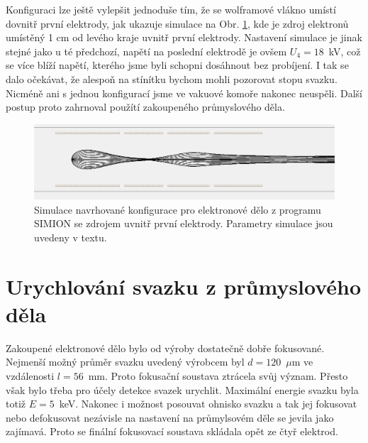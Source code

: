 Konfiguraci lze ještě vylepšit jednoduše tím, že se wolframové vlákno umístí dovnitř první elektrody, jak ukazuje simulace na Obr. \ref{05simulaceVlastniDeloWehnelt}, kde je zdroj elektronů umístěný 1 cm od levého kraje uvnitř první elektrody. Nastavení simulace je jinak stejné jako u té předchozí, napětí na poslední elektrodě je ovšem $U_4 = 18$~kV, což se více blíží napětí, kterého jsme byli schopni dosáhnout bez probíjení. I tak se dalo očekávat, že alespoň na stínítku bychom mohli pozorovat stopu svazku. Nicméně ani s jednou konfigurací jsme ve vakuové komoře nakonec neuspěli. Další postup proto zahrnoval použítí zakoupeného průmyslového děla.\\

\begin{figure}[htbp!]
\centering
\includegraphics[width = 366 pt]{Figure/05/2c.jpg}
\caption{Simulace navrhované konfigurace pro elektronové dělo z programu SIMION se zdrojem uvnitř první elektrody. Parametry simulace jsou uvedeny v textu. }
\label{05simulaceVlastniDeloWehnelt}
\end{figure}

\section{Urychlování svazku z průmyslového děla}

Zakoupené elektronové dělo bylo od výroby dostatečně dobře fokusované. Nejmenší možný průměr svazku uvedený výrobcem byl $d = 120$~$\mu$m ve vzdálenosti $l = 56$~mm. Proto fokusační soustava ztrácela svůj význam. Přesto však bylo třeba pro účely detekce svazek urychlit. Maximální energie svazku byla totiž $E = 5$~keV. Nakonec i možnost posouvat ohnisko svazku a tak jej fokusovat nebo defokusovat nezávisle na nastavení na průmylsovém děle se jevila jako zajímavá. Proto se finální fokusovací soustava skládala opět ze čtyř elektrod.\\

